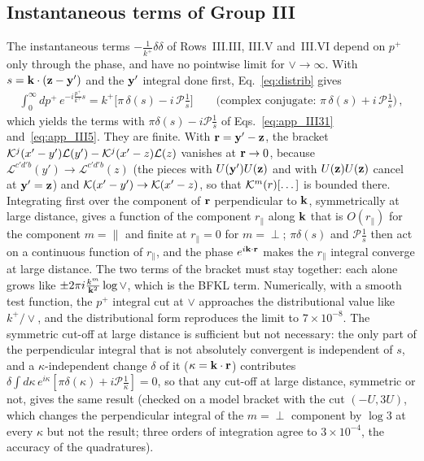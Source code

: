 \subsection{Instantaneous terms of Group III}\label{sec:fin_inst}

The instantaneous terms $-\frac{1}{k^+}\delta\delta$ of Rows~III.III, III.V and~III.VI depend on $p^+$ only through the phase, and have no pointwise limit for $\vee\to\infty$. With $s=\mathbf{k}\cdot(\mathbf{z}-\mathbf{y}')$ and the $\mathbf{y}'$ integral done first, Eq.~\eqref{eq:distrib} gives
\begin{align}\label{eq:instdistr}
\int_0^\infty dp^+\,e^{-i\frac{p^+}{k^+}s}=k^+\Big[\pi\,\delta(s)-i\,\mathcal P\frac1s\Big]\qquad\Big(\text{complex conjugate: }\pi\,\delta(s)+i\,\mathcal P\frac1s\Big)\,,
\end{align}
which yields the terms with $\pi\delta(s)-i\mathcal P\frac1s$ of Eqs.~\eqref{eq:app_III31} and~\eqref{eq:app_III5}. They are finite. With $\mathbf{r}=\mathbf{y}'-\mathbf{z}$, the bracket $\mathcal{K}^j(x'-y')\mathcal L(y')-\mathcal{K}^j(x'-z)\mathcal L(z)$ vanishes at $\mathbf{r}\to0$, because $\mathcal L^{c'd'b}(y')\to\mathcal L^{c'd'b}(z)$ (the pieces with $U(\mathbf{y}')U(\mathbf{z})$ and with $U(\mathbf{z})U(\mathbf{z})$ cancel at $\mathbf{y}'=\mathbf{z}$) and $\mathcal{K}(x'-y')\to\mathcal{K}(x'-z)$, so that $\mathcal{K}^m(r)[\dots]$ is bounded there. Integrating first over the component of $\mathbf{r}$ perpendicular to $\mathbf{k}$, symmetrically at large distance, gives a function of the component $r_\parallel$ along $\mathbf{k}$ that is $O(r_\parallel)$ for the component $m=\parallel$ and finite at $r_\parallel=0$ for $m=\perp$; $\pi\delta(s)$ and $\mathcal P\frac1s$ then act on a continuous function of $r_\parallel$, and the phase $e^{i\mathbf{k}\cdot\mathbf{r}}$ makes the $r_\parallel$ integral converge at large distance. The two terms of the bracket must stay together: each alone grows like $\pm2\pi i\frac{k^m}{\mathbf{k}^2}\log\vee$, which is the BFKL term. Numerically, with a smooth test function, the $p^+$ integral cut at $\vee$ approaches the distributional value like $k^+/\vee$, and the distributional form reproduces the limit to $7\times10^{-8}$. The symmetric cut-off at large distance is sufficient but not necessary: the only part of the perpendicular integral that is not absolutely convergent is independent of $s$, and a $\kappa$-independent change $\delta$ of it ($\kappa=\mathbf{k}\cdot\mathbf{r}$) contributes $\delta\int d\kappa\,e^{i\kappa}[\pi\delta(\kappa)+i\mathcal P\frac1\kappa]=0$, so that any cut-off at large distance, symmetric or not, gives the same result (checked on a model bracket with the cut $(-U,3U)$, which changes the perpendicular integral of the $m=\perp$ component by $\log3$ at every $\kappa$ but not the result; three orders of integration agree to $3\times10^{-4}$, the accuracy of the quadratures).


